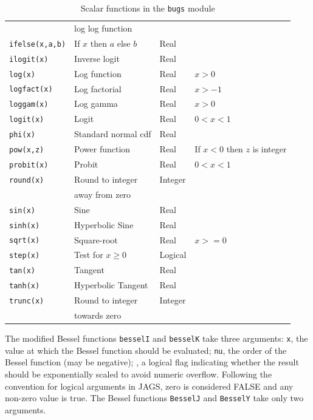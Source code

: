 \documentclass[11pt, a4paper, titlepage]{report}
\begin{document}
\begin{table}[p]
\begin{center}
\begin{tabular}{llll}
                    & log log function    & \\
\verb+ifelse(x,a,b)+ & If $x$ then $a$ else $b$ & Real & \\
\verb+ilogit(x)+    & Inverse logit       & Real & \\
\verb+log(x)+       & Log function        & Real & $x > 0$ \\
\verb+logfact(x)+   & Log factorial       & Real & $x > -1$ \\
\verb+loggam(x)+    & Log gamma           & Real & $x > 0$ \\
\verb+logit(x)+     & Logit               & Real & $0 < x < 1$ \\
\verb+phi(x)+       & Standard normal cdf & Real & \\
\verb+pow(x,z)+     & Power function      & Real & If $x < 0$ then $z$ is integer \\ 
\verb+probit(x)+    & Probit              & Real & $0 < x < 1$ \\
\verb+round(x)+     & Round to integer    & Integer & \\
                    & away from zero      &      & \\
\verb+sin(x)+       & Sine                & Real & \\
\verb+sinh(x)+      & Hyperbolic Sine     & Real & \\
\verb+sqrt(x)+      & Square-root         & Real & $x >= 0$ \\
\verb+step(x)+      & Test for $x \geq 0$ & Logical & \\
\verb+tan(x)+       & Tangent             & Real & \\
\verb+tanh(x)+      & Hyperbolic Tangent  & Real & \\
\verb+trunc(x)+     & Round to integer    & Integer & \\
                    & towards zero        & \\
\hline
\end{tabular}
\caption{Scalar functions in the \texttt{bugs} module \label{table:bugs:scalar}}
\end{center}
\end{table}

The modified Bessel functions \texttt{besselI} and \texttt{besselK}
take three arguments: \texttt{x}, the value at which the Bessel
function should be evaluated; \texttt{nu}, the order of the Bessel
function (may be negative); , a logical flag indicating
whether the result should be exponentially scaled to avoid numeric
overflow. Following the convention for logical arguments in JAGS, zero
is considered FALSE and any non-zero value is true. The Bessel functions
\texttt{BesselJ} and \texttt{BesselY} take only two arguments.
\end{document}
